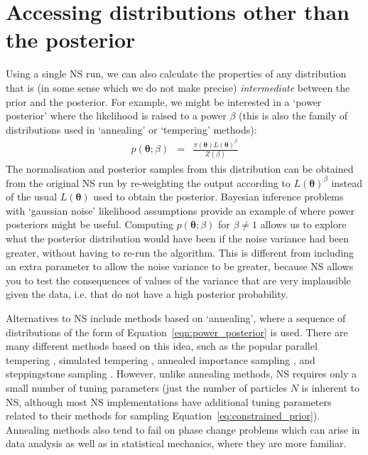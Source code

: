 \documentclass[entropy,article,submit,moreauthors,pdftex,10pt,a4paper]{Definitions/mdpi}
\newcommand{\xx}{\boldsymbol{\theta}}
\begin{document}
\section{Accessing distributions other than the posterior}
Using a single NS run, we can also calculate the properties of any
distribution that
is (in some sense which we do not make precise) {\em intermediate}
between the prior and the posterior. For example, we might be interested in
a `power posterior' where the likelihood is raised to a power $\beta$
(this is also the family of distributions used in `annealing' or `tempering'
methods):
\begin{eqnarray}
p(\xx; \beta) &=& \frac{\pi(\xx)L(\xx)^\beta}
                       {Z(\beta)}\label{eqn:power_posterior}
\end{eqnarray}
The normalisation and posterior samples from this distribution can be obtained
from the original NS run by re-weighting the output according to $L(\xx)^\beta$
instead of the usual $L(\xx)$ used to obtain the posterior.
Bayesian inference problems with `gaussian noise' likelihood assumptions
provide an example of where power posteriors might be useful.
Computing $p(\xx; \beta)$ for $\beta \neq 1$ allows us to explore what the
posterior distribution would have been if the noise variance had been greater,
without having to re-run the algorithm.
This is different from including an extra parameter to allow the noise variance
to be greater, because NS allows you to test the consequences of values of the
variance that are very implausible given the data, i.e. that do not have
a high posterior probability.

Alternatives to NS include methods based on `annealing', where a sequence of
distributions of the form of Equation~\ref{eqn:power_posterior} is used.
There are many different methods based on this idea, such as the popular
parallel tempering \citep{hansmann1997parallel, gregory2005bayesian},
simulated tempering \citep{marinari1992simulated},
annealed importance sampling \citep{neal2001annealed}, and
steppingstone sampling \citep{xie2010improving}.
However, unlike annealing methods, NS requires only a small number of
tuning parameters (just the number of particles $N$ is inherent to NS, although
most NS implementations have additional tuning parameters related to their
methods for sampling Equation~\ref{eq:constrained_prior}). Annealing methods
also tend to fail on phase change problems \citep{skilling} which can arise
in data analysis \citep{rjobject, exoplanet} as well as in statistical
mechanics, where they are more familiar.
\end{document}
